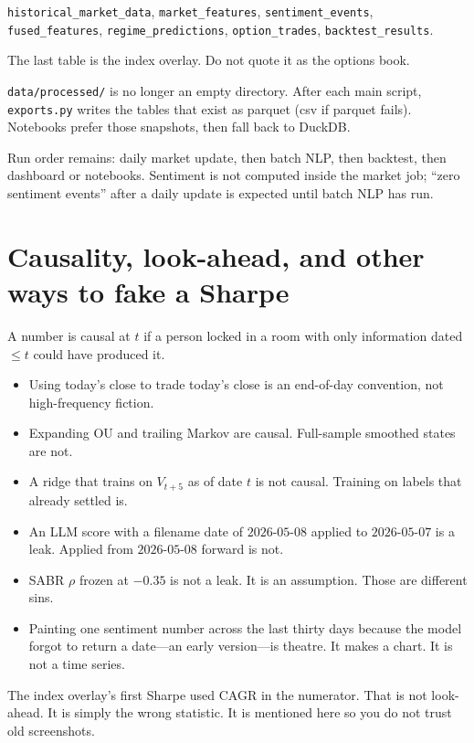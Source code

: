 \documentclass[11pt,a4paper]{article}
\begin{document}
\texttt{historical\_market\_data}, \texttt{market\_features}, \texttt{sentiment\_events}, \texttt{fused\_features}, \texttt{regime\_predictions}, \texttt{option\_trades}, \texttt{backtest\_results}.

The last table is the index overlay. Do not quote it as the options book.

\texttt{data/processed/} is no longer an empty directory. After each main script, \texttt{exports.py} writes the tables that exist as parquet (csv if parquet fails). Notebooks prefer those snapshots, then fall back to DuckDB.

Run order remains: daily market update, then batch NLP, then backtest, then dashboard or notebooks. Sentiment is not computed inside the market job; ``zero sentiment events'' after a daily update is expected until batch NLP has run.

\section{Causality, look-ahead, and other ways to fake a Sharpe}
\label{ch:causal}

A number is causal at $t$ if a person locked in a room with only information dated $\le t$ could have produced it.

\begin{itemize}[leftmargin=1.2em]
  \item Using today's close to trade today's close is an end-of-day convention, not high-frequency fiction.
  \item Expanding OU and trailing Markov are causal. Full-sample smoothed states are not.
  \item A ridge that trains on $V_{t+5}$ as of date $t$ is not causal. Training on labels that already settled is.
  \item An LLM score with a filename date of $2026$-$05$-$08$ applied to $2026$-$05$-$07$ is a leak. Applied from $2026$-$05$-$08$ forward is not.
  \item SABR $\rho$ frozen at $-0.35$ is not a leak. It is an assumption. Those are different sins.
  \item Painting one sentiment number across the last thirty days because the model forgot to return a date---an early version---is theatre. It makes a chart. It is not a time series.
\end{itemize}

The index overlay's first Sharpe used CAGR in the numerator. That is not look-ahead. It is simply the wrong statistic. It is mentioned here so you do not trust old screenshots.
\end{document}
